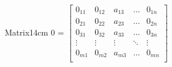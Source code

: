 \begin{definition}{Matrix}{14cm}
        \hspace{0.5cm}
        0 = 
        $
        \begin{bmatrix}
            0_{11} & 0_{12} & a_{13} & \hdots & 0_{1n} \\
            0_{21} & 0_{22} & a_{23} & \hdots & 0_{2n} \\
            0_{31} & 0_{32} & a_{33} & \hdots & 0_{3n} \\
            \vdots & \vdots & \vdots & \ddots & \vdots \\
            0_{m1} & 0_{m2} & a_{m3} & \hdots & 0_{mn} \\
        \end{bmatrix}
        $
    \end{definition}

    \vspace{0.5cm}



